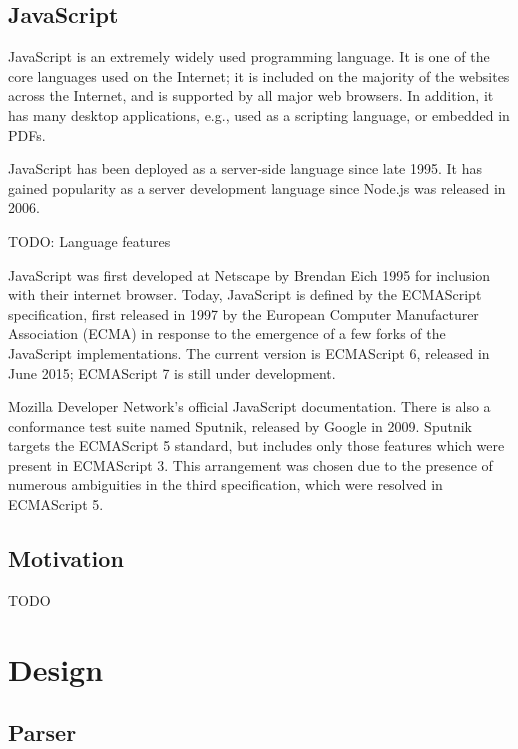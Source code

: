 \documentclass{article}
\begin{document}
\begin{multicols}{2}
\subsection{JavaScript}

JavaScript is an extremely widely used programming language. It is one of the
core languages used on the Internet; it is included on the majority of the
websites across the Internet, and is supported by all major web browsers. In
addition, it has many desktop applications, e.g., used as a scripting
language, or embedded in PDFs. \newline

JavaScript has been deployed as a server-side language since late 1995. It has
gained popularity as a server development language since Node.js was released in
2006.\newline

TODO: Language features \newline

JavaScript was first developed at Netscape by Brendan Eich 1995 for inclusion
with their internet browser. Today, JavaScript is defined by the ECMAScript
specification, first released in 1997 by the European Computer Manufacturer
Association (ECMA) in response to the emergence of a few forks of the JavaScript
implementations. The current version is ECMAScript 6, released in June 2015;
ECMAScript 7 is still under development.\newline

Mozilla Developer Network's official JavaScript documentation\cite{mozdocs}.
There is also a conformance test suite named Sputnik, released by Google in
2009. Sputnik targets the ECMAScript 5 standard, but includes only those
features which were present in ECMAScript 3. This arrangement was chosen due to
the presence of numerous ambiguities in the third specification, which were
resolved in ECMAScript 5.

\subsection{Motivation}

TODO

\section{Design}

\subsection{Parser}


\end{multicols}
\end{document}
